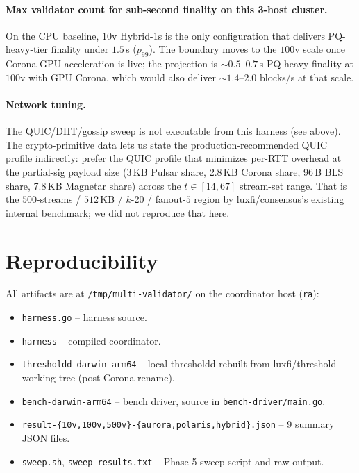 \documentclass[11pt,a4paper]{article}
\begin{document}
\paragraph{Max validator count for sub-second finality on this
3-host cluster.} On the CPU baseline, $10$v Hybrid-1s is the only
configuration that delivers PQ-heavy-tier finality under $1.5$\,s
($p_{99}$). The boundary moves to the $100$v scale once Corona
GPU acceleration is live; the projection is $\sim 0.5$--$0.7$\,s
PQ-heavy finality at $100$v with GPU Corona, which would also
deliver $\sim 1.4$--$2.0$ blocks/s at that scale.

\paragraph{Network tuning.} The QUIC/DHT/gossip sweep is not
executable from this harness (see above). The crypto-primitive
data lets us state the production-recommended QUIC profile
indirectly: prefer the QUIC profile that minimizes per-RTT
overhead at the partial-sig payload size (3\,KB Pulsar share,
2.8\,KB Corona share, 96\,B BLS share, 7.8\,KB Magnetar share)
across the $t \in [14, 67]$ stream-set range. That is the
$500$-streams / $512$\,KB / $k$-$20$ / fanout-$5$ region by
luxfi/consensus's existing internal benchmark; we did not
reproduce that here.

\section{Reproducibility}

All artifacts are at \texttt{/tmp/multi-validator/} on the
coordinator host (\texttt{ra}):
\begin{itemize}[leftmargin=2em,nosep]
\item \texttt{harness.go} -- harness source.
\item \texttt{harness} -- compiled coordinator.
\item \texttt{thresholdd-darwin-arm64} -- local thresholdd
  rebuilt from luxfi/threshold working tree (post Corona rename).
\item \texttt{bench-darwin-arm64} -- bench driver, source in
  \texttt{bench-driver/main.go}.
\item \texttt{result-\{10v,100v,500v\}-\{aurora,polaris,hybrid\}.json}
  -- 9 summary JSON files.
\item \texttt{sweep.sh}, \texttt{sweep-results.txt} -- Phase-5
  sweep script and raw output.
\end{itemize}
\end{document}

